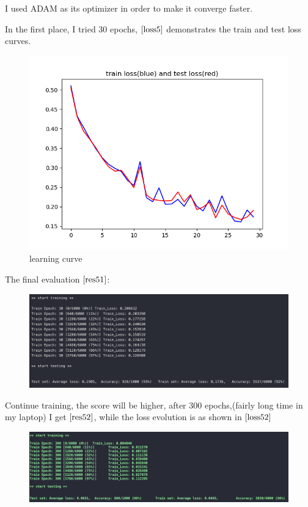 \documentclass[a4paper,12pt]{article}
\begin{document}
I used ADAM as its optimizer in order to make it converge faster.

In the first place, I tried 30 epochs, $\ref{loss5}$ demonstrates the train and test loss curves.
\begin{figure}[htbp]
    \centering
    \includegraphics[width = \textwidth]{loss5}
    \caption{learning curve}
    \label{loss5}
\end{figure}

The final evaluation $\ref{res51}$:
\begin{figure}[htbp]
    \centering
    \includegraphics[width = \textwidth]{res51}
    \caption{}
    \label{res51}
\end{figure}

Continue training, the score will be higher, after 300 epochs,(fairly long time in my laptop)
I get $\ref{res52}$, while the loss evolution is as shown in $\ref{loss52}$
\begin{figure}[htbp]
    \centering
    \includegraphics[width = \textwidth]{res52}
    \caption{}
    \label{res52}
\end{figure}
\end{document}
